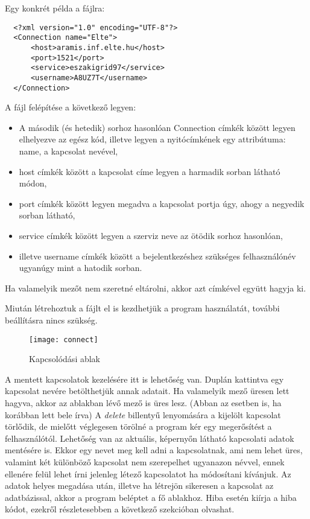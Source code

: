 Egy konkrét példa a fájlra:

\begin{lstlisting}
  <?xml version="1.0" encoding="UTF-8"?>
  <Connection name="Elte">
      <host>aramis.inf.elte.hu</host>
      <port>1521</port>
      <service>eszakigrid97</service>
      <username>A8UZ7T</username>
  </Connection>
\end{lstlisting}

A fájl felépítése a következő legyen:
\begin{itemize}
  \item A második (és hetedik) sorhoz hasonlóan Connection címkék között legyen elhelyezve az egész kód, illetve legyen a
  nyitócímkének egy attribútuma: name, a kapcsolat nevével,
  \item host címkék között a kapcsolat címe legyen a harmadik sorban látható módon,
  \item port címkék között legyen megadva a kapcsolat portja úgy, ahogy a negyedik sorban látható,
  \item service címkék között legyen a szerviz neve az ötödik sorhoz hasonlóan,
  \item illetve username címkék között a bejelentkezéshez szükséges felhasználónév ugyanúgy mint a hatodik sorban.
\end{itemize}
Ha valamelyik mezőt nem szeretné eltárolni, akkor azt címkével együtt hagyja ki.

Miután létrehoztuk a fájlt el is kezdhetjük a program használatát, további beállításra nincs szükség.
\begin{figure}[ht]
  \begin{center}
  \texttt{[image: connect]}
  \end{center}
 \caption{Kapcsolódási ablak}
\end{figure}
A mentett kapcsolatok kezelésére itt is lehetőség van. 
Duplán kattintva egy kapcsolat nevére betölthetjük annak adatait. Ha valamelyik mező üresen lett hagyva,
akkor az ablakban lévő mező is üres lesz. (Abban az esetben is, ha korábban lett bele írva)
A \textit{delete} billentyű lenyomására a kijelölt kapcsolat törlődik, de
mielőtt véglegesen törölné a program kér egy megerősítést a felhasználótól.
Lehetőség van az aktuális, képernyőn látható kapcsolati adatok mentésére is. Ekkor egy nevet meg kell adni a kapcsolatnak, ami nem lehet üres,
valamint két különböző kapcsolat nem szerepelhet ugyanazon névvel, ennek ellenére felül lehet írni jelenleg létező kapcsolatot ha módosítani
kívánjuk.
Az adatok helyes megadása után, illetve ha létrejön sikeresen a kapcsolat az adatbázissal, akkor a program beléptet a fő ablakhoz.
Hiba esetén kiírja a hiba kódot, ezekről részletesebben a következő szekcióban olvashat.

